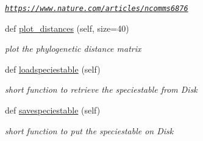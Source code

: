 \begin{DoxyCompactItemize}
\begin{DoxyCompactList}\small\item\em \href{https://www.nature.com/articles/ncomms6876}{\tt https\+://www.\+nature.\+com/articles/ncomms6876} \end{DoxyCompactList}\item 
def \mbox{\hyperlink{class_py_c_u_b_1_1py_c_u_b_1_1_py_c_u_b_a4e13b55153bbe774e9203818f2b7f690}{plot\+\_\+distances}} (self, size=40)
\begin{DoxyCompactList}\small\item\em plot the phylogenetic distance matrix \end{DoxyCompactList}\item 
def \mbox{\hyperlink{class_py_c_u_b_1_1py_c_u_b_1_1_py_c_u_b_ac37364050a4ec9a7ddf3d6c1562e49a5}{loadspeciestable}} (self)
\begin{DoxyCompactList}\small\item\em short function to retrieve the speciestable from Disk \end{DoxyCompactList}\item 
def \mbox{\hyperlink{class_py_c_u_b_1_1py_c_u_b_1_1_py_c_u_b_a8249834e1d2f7d061ae06ffa5a1adc32}{savespeciestable}} (self)
\begin{DoxyCompactList}\small\item\em short function to put the speciestable on Disk \end{DoxyCompactList}\end{DoxyCompactItemize}
